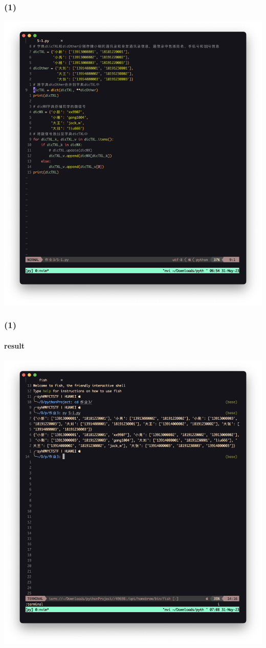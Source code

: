 \documentclass{beamer}
\begin{document}
  \begin{frame}[fragile]
    \frametitle{(1)}
    \centering
    \includegraphics[width=\textwidth,height=0.8\textheight]{graph/5-1.png}
  \end{frame}
    \frametitle{(1)}
  \begin{frame}[fragile]
    \framesubtitle{result}
    \centering
    \includegraphics[width=\textwidth,height=0.8\textheight]{graph/_5-1.png}
  \end{frame}
\end{document}
